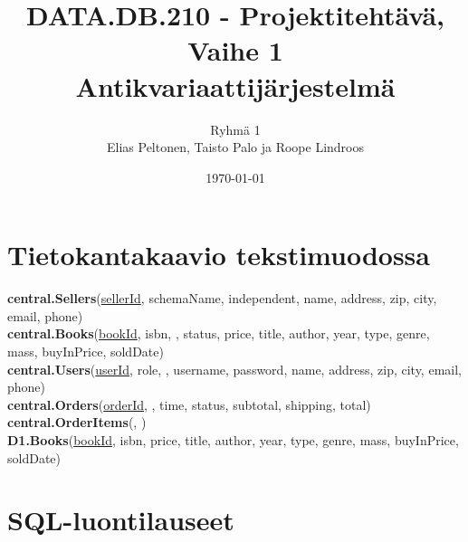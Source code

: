 \documentclass[11pt,a4paper]{article}
\title{DATA.DB.210 - Projektitehtävä, Vaihe 1 \\ \large Antikvariaattijärjestelmä}
\author{Ryhmä 1 \\ \small Elias Peltonen, Taisto Palo ja Roope Lindroos}
\date{\today}
\begin{document}
\maketitle


\newpage

\section*{Tietokantakaavio tekstimuodossa}

\noindent
\textbf{central.Sellers}(\underline{sellerId}, schemaName, independent, name, address, zip, city, email, phone) \\[0.5em]
\textbf{central.Books}(\underline{bookId}, isbn, , status, price, title, author, year, type, genre, mass, buyInPrice, soldDate) \\[0.5em]
\textbf{central.Users}(\underline{userId}, role, , username, password, name, address, zip, city, email, phone) \\[0.5em]
\textbf{central.Orders}(\underline{orderId}, , time, status, subtotal, shipping, total) \\[0.5em]
\textbf{central.OrderItems}(, ) \\[0.5em]
\textbf{D1.Books}(\underline{bookId}, isbn, price, title, author, year, type, genre, mass, buyInPrice, soldDate) \\[0.5em]

\section*{SQL-luontilauseet}
\inputminted{sql}{create.sql}
\end{document}
